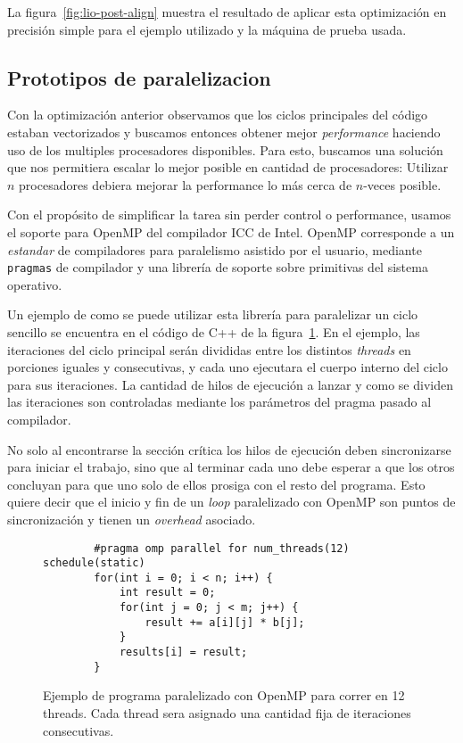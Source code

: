 La figura~\ref{fig:lio-post-align} muestra el resultado de aplicar esta optimizaci\'on
en precisi\'on simple para el ejemplo utilizado y la m\'aquina de prueba usada.


\subsection{Prototipos de paralelizacion}

Con la optimizaci\'on anterior observamos que los ciclos principales del c\'odigo
estaban vectorizados y buscamos entonces obtener mejor \textit{performance} haciendo
uso de los multiples procesadores disponibles. Para esto, buscamos una soluci\'on
que nos permitiera escalar lo mejor posible en cantidad de procesadores: Utilizar
$n$ procesadores debiera mejorar la performance lo m\'as cerca de $n$-veces posible.


Con el prop\'osito de simplificar la tarea sin perder control o performance, 
usamos el soporte para OpenMP del compilador ICC de Intel. OpenMP corresponde a
un \textit{estandar} de compiladores para paralelismo asistido por el usuario,
mediante \texttt{pragmas} de compilador y una librer\'ia de soporte sobre 
primitivas del sistema operativo. 

Un ejemplo de como se puede utilizar esta librer\'ia para paralelizar un ciclo
sencillo se encuentra en el c\'odigo de C++ de la figura~\ref{fig:openmp-example}.
En el ejemplo, las iteraciones del ciclo principal ser\'an divididas entre los
distintos \textit{threads} en porciones iguales y consecutivas, y cada uno
ejecutara el cuerpo interno del ciclo para sus iteraciones. La cantidad de 
hilos de ejecuci\'on a lanzar y como se dividen las iteraciones son controladas
mediante los par\'ametros del pragma pasado al compilador.

No solo al encontrarse la secci\'on cr\'itica los hilos de ejecuci\'on deben
sincronizarse para iniciar el trabajo, sino que al terminar cada uno debe esperar
a que los otros concluyan para que uno solo de ellos prosiga con el resto del
programa. Esto quiere decir que el inicio y fin de un \textit{loop} paralelizado
con OpenMP son puntos de sincronizaci\'on y tienen un \textit{overhead} asociado.

\begin{figure}[htbp]
    \label{fig:openmp-example}
    \begin{lstlisting}
        #pragma omp parallel for num_threads(12) schedule(static)
        for(int i = 0; i < n; i++) {
            int result = 0;
            for(int j = 0; j < m; j++) {
                result += a[i][j] * b[j];
            }
            results[i] = result;
        }
    \end{lstlisting}
    \caption{Ejemplo de programa paralelizado con OpenMP para correr en 12 threads. Cada thread
    sera asignado una cantidad fija de iteraciones consecutivas.}
\end{figure}

